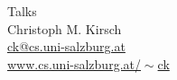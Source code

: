 \documentclass[a4paper]{article}
\begin{document}


\begin{center}
{\sc \Large Talks} \\[5mm]
{\sc \large Christoph M. Kirsch} \\[2mm]
\href{mailto:ck@cs.uni-salzburg.at}{ck@cs.uni-salzburg.at} \\
\href{http://www.cs.uni-salzburg.at/~ck}{www.cs.uni-salzburg.at/$\!\sim$ck}
\end{center}


\end{document}
